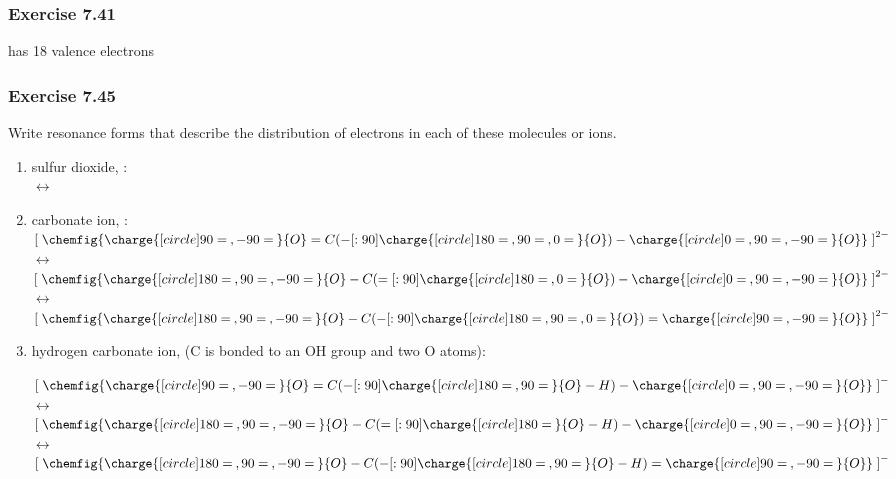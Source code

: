 \documentclass[11pt]{article}
\begin{document}
\subsubsection{Exercise 7.41}

 has 18 valence electrons \\[2ex]


\subsubsection{Exercise 7.45}

Write resonance forms that describe the distribution of electrons in each of these molecules or ions.

\begin{enumerate}

\item sulfur dioxide, : \\[2ex]

\qquad $\longleftrightarrow$ \qquad
{} \\[2ex]

\item  carbonate ion, : \\[2ex]

$\left[\;
\chemfig{
    \charge{[circle]90=\:,-90=\:}{O}
    =C (-[:90]\charge{[circle]180=\:,90=\:,0=\:}{O})
    -\charge{[circle]0=\:,90=\:,-90=\:}{O}
}
\;\right]^{2-}$
\qquad $\longleftrightarrow$ \qquad
$\left[\;
\chemfig{
    \charge{[circle]180=\:,90=\:,-90=\:}{O}
    -C (=[:90]\charge{[circle]180=\:,0=\:}{O})
    -\charge{[circle]0=\:,90=\:,-90=\:}{O}
}
\;\right]^{2-}$
\qquad $\longleftrightarrow$ \qquad
$\left[\;
\chemfig{
    \charge{[circle]180=\:,90=\:,-90=\:}{O}
    -C (-[:90]\charge{[circle]180=\:,90=\:,0=\:}{O})
    =\charge{[circle]90=\:,-90=\:}{O}
}
\;\right]^{2-}$

\item  hydrogen carbonate ion,  (C is bonded to an OH group and two O atoms):

$\left[\;
\chemfig{
    \charge{[circle]90=\:,-90=\:}{O}
    =C (-[:90]\charge{[circle]180=\:,90=\:}{O} - H)
    -\charge{[circle]0=\:,90=\:,-90=\:}{O}
}
\;\right]^-$
\qquad $\longleftrightarrow$ \qquad
$\left[\;
\chemfig{
    \charge{[circle]180=\:,90=\:,-90=\:}{O}
    -C (=[:90]\charge{[circle]180=\:}{O} - H)
    -\charge{[circle]0=\:,90=\:,-90=\:}{O}
}
\;\right]^-$
\qquad $\longleftrightarrow$ \qquad
$\left[\;
\chemfig{
    \charge{[circle]180=\:,90=\:,-90=\:}{O}
    -C (-[:90]\charge{[circle]180=\:,90=\:}{O} - H)
    =\charge{[circle]90=\:,-90=\:}{O}
}
\;\right]^-$


\end{enumerate}
\end{document}
